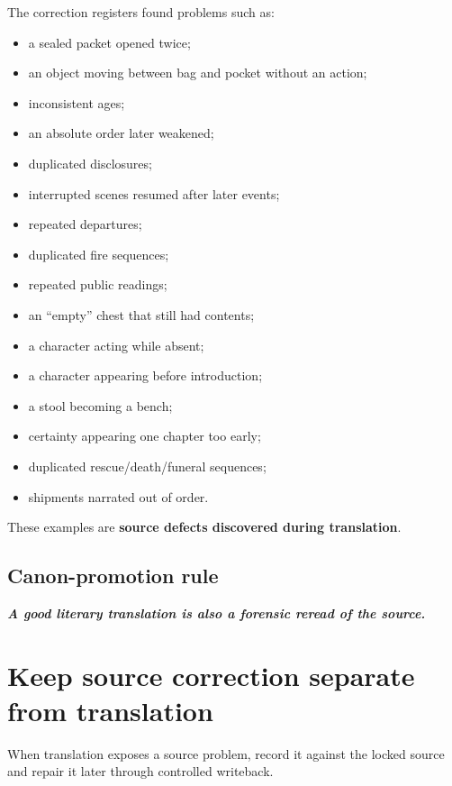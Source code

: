 \documentclass[11pt,oneside,openany]{book}
\renewenvironment{quote}{\begin{insightbox}\itshape}{\end{insightbox}}
\providecommand{\tightlist}{%
  \setlength{\itemsep}{0pt}\setlength{\parskip}{0pt}}
\begin{document}
The correction registers found problems such as:

\begin{itemize}
\tightlist
\item
  a sealed packet opened twice;
\item
  an object moving between bag and pocket without an action;
\item
  inconsistent ages;
\item
  an absolute order later weakened;
\item
  duplicated disclosures;
\item
  interrupted scenes resumed after later events;
\item
  repeated departures;
\item
  duplicated fire sequences;
\item
  repeated public readings;
\item
  an ``empty'' chest that still had contents;
\item
  a character acting while absent;
\item
  a character appearing before introduction;
\item
  a stool becoming a bench;
\item
  certainty appearing one chapter too early;
\item
  duplicated rescue/death/funeral sequences;
\item
  shipments narrated out of order.
\end{itemize}

These examples are \textbf{source defects discovered during translation}.

\section{Canon-promotion rule}\label{canon-promotion-rule}

\begin{quote}
\textbf{A good literary translation is also a forensic reread of the source.}

\end{quote}

\chapter{Keep source correction separate from translation}

When translation exposes a source problem, record it against the locked source and repair it later through controlled writeback.
\end{document}
